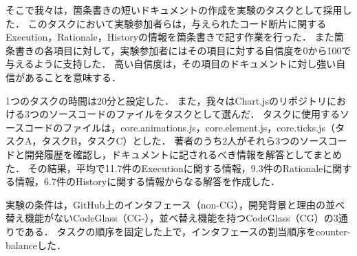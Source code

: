 そこで我々は，箇条書きの短いドキュメントの作成を実験のタスクとして採用した．
このタスクにおいて実験参加者らは，与えられたコード断片に関するExecution，Rationale，Historyの情報を箇条書きで記す作業を行った．
また箇条書きの各項目に対して，実験参加者にはその項目に対する自信度を0から100で与えるように支持した．
高い自信度は，その項目のドキュメントに対し強い自信があることを意味する．


1つのタスクの時間は20分と設定した．
また，我々はChart.jsのリポジトリにおける3つのソースコードのファイルをタスクとして選んだ．
タスクに使用するソースコードのファイルは，core.animations.js，core.element.js，core.ticks.js（タスクA，タスクB，タスクC）とした．
著者のうち2人がそれら3つのソースコードと開発履歴を確認し，ドキュメントに記されるべき情報を解答としてまとめた．
その結果，平均で11.7件のExecutionに関する情報，9.3件のRationaleに関する情報，6.7件のHistoryに関する情報からなる解答を作成した．



実験の条件は，GitHub上のインタフェース（non-CG），開発背景と理由の並べ替え機能がないCodeGlass（CG-），並べ替え機能を持つCodeGlass（CG）の3通りである．
タスクの順序を固定した上で，インタフェースの割当順序をcounter-balanceした．


